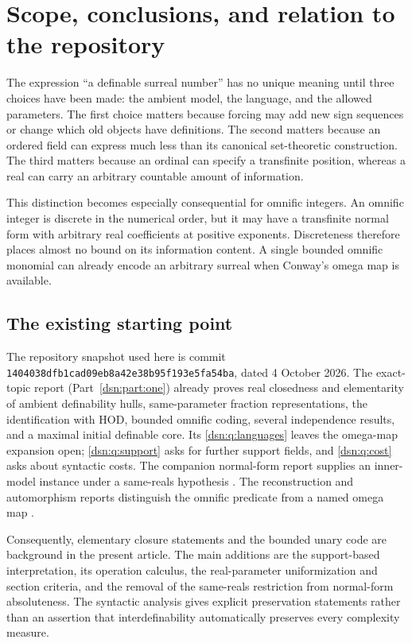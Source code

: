 \documentclass[11pt,a4paper]{article}
\numberwithin{equation}{section}
\theoremstyle{definition}
\theoremstyle{remark}
\begin{document}
\section{Scope, conclusions, and relation to the repository}
\label{dsn:op:sec:scope}

The expression ``a definable surreal number'' has no unique meaning until
three choices have been made: the ambient model, the language, and the
allowed parameters.  The first choice matters because forcing may add new
sign sequences or change which old objects have definitions.  The second
matters because an ordered field can express much less than its canonical
set-theoretic construction.  The third matters because an ordinal can
specify a transfinite position, whereas a real can carry an arbitrary
countable amount of information.

This distinction becomes especially consequential for omnific integers.
An omnific integer is discrete in the numerical order, but it may have a
transfinite normal form with arbitrary real coefficients at positive
exponents.  Discreteness therefore places almost no bound on its
information content.  A single bounded omnific monomial can already encode
an arbitrary surreal when Conway's omega map is available.

\subsection{The existing starting point}

The repository snapshot used here is commit
\texttt{1404038dfb1cad09eb8a42e38b95f193e5fa54ba}, dated 4 October 2026.
The exact-topic report (Part~\ref{dsn:part:one}) already proves real closedness and
elementarity of ambient definability hulls, same-parameter fraction
representations, the identification with HOD, bounded omnific coding,
several independence results, and a maximal initial definable core.
Its \cref{dsn:q:languages} leaves the omega-map expansion open; \cref{dsn:q:support}
asks for further support fields, and \cref{dsn:q:cost} asks about syntactic
costs.  The companion normal-form report supplies an inner-model instance
under a same-reals hypothesis \cite{RepoLce}.  The reconstruction and
automorphism reports distinguish the omnific predicate from a named omega
map \cite{RepoOdg,RepoOpa}.

Consequently, elementary closure statements and the bounded unary code
are background in the present article.  The main additions are the
support-based interpretation, its operation calculus, the real-parameter
uniformization and section criteria, and the removal of the same-reals
restriction from normal-form absoluteness.  The syntactic analysis gives
explicit preservation statements rather than an assertion that
interdefinability automatically preserves every complexity measure.
\end{document}
